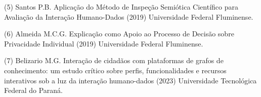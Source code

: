 \documentclass[
	12pt,				%
	oneside,			%
	a4paper,			%
	english,			%
	brazil				%
	]{abntex2ppgsi}
\begin{document}
\begin{apendicesenv}
(5) Santos P.B. Aplicação do Método de Inspeção Semiótica Científico para Avaliação da Interação Humano-Dados (2019) Universidade Federal Fluminense.

(6) Almeida M.C.G. Explicação como Apoio ao Processo de Decisão sobre Privacidade Individual (2019) Universidade Federal Fluminense.

(7) Belizario M.G. Interação de cidadãos com plataformas de grafos de conhecimento: um estudo crítico sobre perfis, funcionalidades e recursos interativos sob a luz da interação humano-dados (2023) Universidade Tecnológica Federal do Paraná.












\end{apendicesenv}
\end{document}
